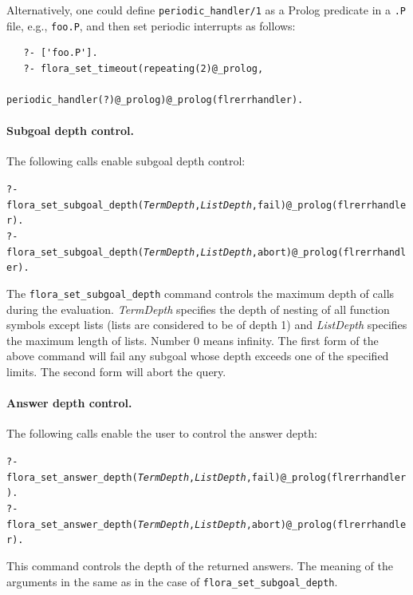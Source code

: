 \documentclass[11pt]{article}
\begin{document}
Alternatively, one could define \texttt{periodic\_handler/1} as a Prolog
predicate in a \texttt{.P} file, e.g., \texttt{foo.P}, and then set
periodic interrupts as follows:  
\begin{verbatim}
   ?- ['foo.P'].
   ?- flora_set_timeout(repeating(2)@_prolog,
                        periodic_handler(?)@_prolog)@_prolog(flrerrhandler).
\end{verbatim}

\paragraph{Subgoal depth control.} The following calls enable subgoal depth
control:
\begin{alltt}
    ?- flora_set_subgoal_depth(\emph{TermDepth},\emph{ListDepth},fail)@_prolog(flrerrhandler).
    ?- flora_set_subgoal_depth(\emph{TermDepth},\emph{ListDepth},abort)@_prolog(flrerrhandler).
\end{alltt}
The \texttt{flora\_set\_subgoal\_depth} command controls the maximum depth
of calls during the evaluation. \emph{TermDepth} specifies the depth of
nesting of all function symbols except lists (lists are considered to be of
depth 1) and \emph{ListDepth} specifies the maximum length of lists. Number
0 means infinity. The first form of the above command will fail any subgoal
whose depth exceeds one of the specified limits. The second form will abort
the query.  

\paragraph{Answer depth control.} The following calls enable the user to
control the answer depth:
\begin{alltt}
    ?- flora_set_answer_depth(\emph{TermDepth},\emph{ListDepth},fail)@_prolog(flrerrhandler).
    ?- flora_set_answer_depth(\emph{TermDepth},\emph{ListDepth},abort)@_prolog(flrerrhandler).
\end{alltt}
This command controls the depth of the returned answers. The meaning of the
arguments in the same as in the case of \texttt{flora\_set\_subgoal\_depth}.
\end{document}
